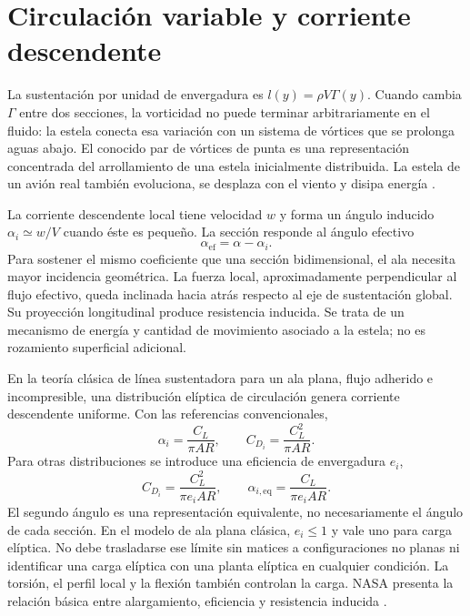 \section{Circulación variable y corriente descendente}
La sustentación por unidad de envergadura es $l(y)=\rho V\Gamma(y)$. Cuando cambia $\Gamma$ entre dos secciones, la vorticidad no puede terminar arbitrariamente en el fluido: la estela conecta esa variación con un sistema de vórtices que se prolonga aguas abajo. El conocido par de vórtices de punta es una representación concentrada del arrollamiento de una estela inicialmente distribuida. La estela de un avión real también evoluciona, se desplaza con el viento y disipa energía \cite{PHAK}.

La corriente descendente local tiene velocidad $w$ y forma un ángulo inducido $\alpha_i\simeq w/V$ cuando éste es pequeño. La sección responde al ángulo efectivo
\begin{equation}
\alpha_{\mathrm{ef}}=\alpha-\alpha_i.
\end{equation}
Para sostener el mismo coeficiente que una sección bidimensional, el ala necesita mayor incidencia geométrica. La fuerza local, aproximadamente perpendicular al flujo efectivo, queda inclinada hacia atrás respecto al eje de sustentación global. Su proyección longitudinal produce resistencia inducida. Se trata de un mecanismo de energía y cantidad de movimiento asociado a la estela; no es rozamiento superficial adicional.

En la teoría clásica de línea sustentadora para un ala plana, flujo adherido e incompresible, una distribución elíptica de circulación genera corriente descendente uniforme. Con las referencias convencionales,
\begin{equation}\label{eq:10-ind}
\alpha_i=\frac{C_L}{\pi AR},\qquad C_{D_i}=\frac{C_L^2}{\pi AR}.
\end{equation}
Para otras distribuciones se introduce una eficiencia de envergadura $e_i$,
\begin{equation}
C_{D_i}=\frac{C_L^2}{\pi e_i AR},\qquad
\alpha_{i,\mathrm{eq}}=\frac{C_L}{\pi e_i AR}.
\end{equation}
El segundo ángulo es una representación equivalente, no necesariamente el ángulo de cada sección. En el modelo de ala plana clásica, $e_i\leq1$ y vale uno para carga elíptica. No debe trasladarse ese límite sin matices a configuraciones no planas ni identificar una carga elíptica con una planta elíptica en cualquier condición. La torsión, el perfil local y la flexión también controlan la carga. NASA presenta la relación básica entre alargamiento, eficiencia y resistencia inducida \cite{NASA-BGA}.

